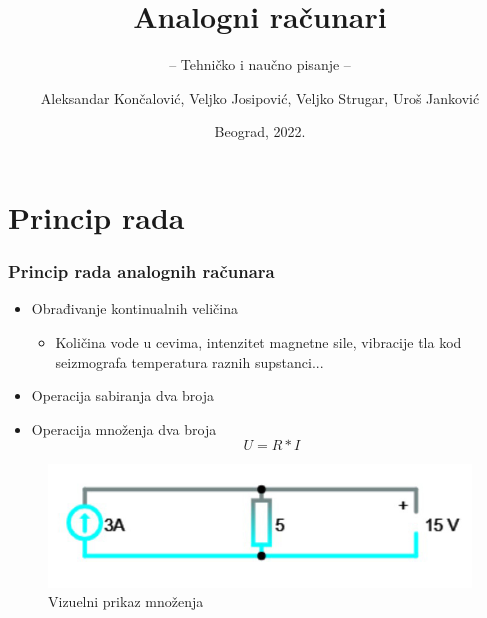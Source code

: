 \documentclass[14pt]{beamer}
\title{Analogni računari}
\subtitle{-- Tehničko i naučno pisanje --}
\author{Aleksandar Končalović, Veljko Josipović, Veljko Strugar, Uroš Janković}
\institute{Matematički fakultet\\Univerzitet u Beogradu}
\date{
	\footnotesize{Beograd, 2022.}	
}
\begin{document}
\begin{frame}
	\thispagestyle{empty}
	\titlepage
\end{frame}

\addtocounter{framenumber}{-1}

\section{Princip rada}

\begin{frame}[fragile]\frametitle{Princip rada analognih računara}
	\begin{itemize}	
		\item Obrađivanje kontinualnih veličina
		  \begin{itemize}
                \item Količina vode u cevima, intenzitet magnetne sile, vibracije tla kod seizmografa temperatura raznih supstanci...
            \end{itemize}          
	

\item Operacija sabiranja dva broja

\item Operacija množenja dva broja \\ $$ U = R*I $$
\end{itemize}
\begin{figure}[h!]
\begin{center}
\includegraphics[scale=0.6]{Struja.jpg}
\end{center}
\caption{Vizuelni prikaz množenja}
\label{fig:h1}
\end{figure}
\end{frame}
\end{document}

